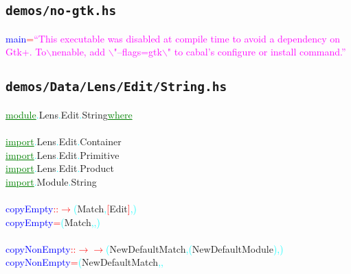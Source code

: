 \subsection{\texttt{demos/no-gtk.hs}}
\label{mod:no-gtk}
\textcolor{blue}{main}\hsspace \textcolor{red}{=}\hsspace \textcolor{magenta}{``This executable was disabled at compile time to avoid a dependency on Gtk+. To$\backslash$nenable, add $\backslash$"--flags=gtk$\backslash$" to cabal's configure or install command.''}\\
\subsection{\texttt{demos/Data/Lens/Edit/String.hs}}
\label{mod:Data.Lens.Edit.String}
\textcolor{green}{\underline{module}}\textcolor{cyan}{.}{\rm{}Lens}\textcolor{cyan}{.}{\rm{}Edit}\textcolor{cyan}{.}{\rm{}String}\hsspace \textcolor{green}{\underline{where}}\\\\\textcolor{green}{\underline{import}}\textcolor{cyan}{.}{\rm{}Lens}\textcolor{cyan}{.}{\rm{}Edit}\textcolor{cyan}{.}{\rm{}Container}\\\textcolor{green}{\underline{import}}\textcolor{cyan}{.}{\rm{}Lens}\textcolor{cyan}{.}{\rm{}Edit}\textcolor{cyan}{.}{\rm{}Primitive}\\\textcolor{green}{\underline{import}}\textcolor{cyan}{.}{\rm{}Lens}\textcolor{cyan}{.}{\rm{}Edit}\textcolor{cyan}{.}{\rm{}Product}\\\textcolor{green}{\underline{import}}\textcolor{cyan}{.}{\rm{}Module}\textcolor{cyan}{.}{\rm{}String}\\\\\textcolor{blue}{copyEmpty}\hsspace \textcolor{red}{::}\hsspace \textcolor{red}{\ensuremath{\rightarrow}}\hsspace \textcolor{cyan}{(}{\rm{}Match}\textcolor{cyan}{,}\hsspace \textcolor{red}{[}{\rm{}Edit}\textcolor{red}{]}\textcolor{cyan}{,}\textcolor{cyan}{)}\\\textcolor{blue}{copyEmpty}\hsspace \textcolor{red}{=}\hsspace \textcolor{cyan}{(}{\rm{}Match}\textcolor{cyan}{,}\textcolor{cyan}{,}\textcolor{cyan}{)}\\\\\textcolor{blue}{copyNonEmpty}\hsspace \textcolor{red}{::}\hsspace \textcolor{red}{\ensuremath{\rightarrow}}\hsspace \textcolor{red}{\ensuremath{\rightarrow}}\hsspace \textcolor{cyan}{(}{\rm{}NewDefaultMatch}\textcolor{cyan}{,}\hsspace \textcolor{cyan}{(}{\rm{}NewDefaultModule}\textcolor{cyan}{)}\textcolor{cyan}{,}\textcolor{cyan}{)}\\\textcolor{blue}{copyNonEmpty}\hsspace \textcolor{red}{=}\hsspace \textcolor{cyan}{(}{\rm{}NewDefaultMatch}\textcolor{cyan}{,}\textcolor{cyan}{,}\hsspace 